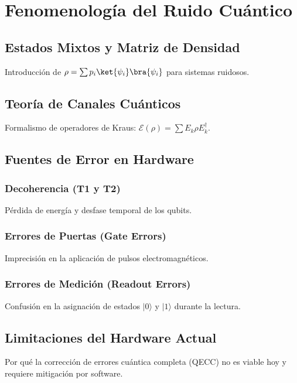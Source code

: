 \chapter{Fenomenología del Ruido Cuántico}
\label{cap:ruido}

\section{Estados Mixtos y Matriz de Densidad}
Introducción de $\rho = \sum p_i \ket{\psi_i}\bra{\psi_i}$ para sistemas ruidosos.

\section{Teoría de Canales Cuánticos}
Formalismo de operadores de Kraus: $\mathcal{E}(\rho) = \sum E_k \rho E_k^\dagger$.

\section{Fuentes de Error en Hardware}
\subsection{Decoherencia (T1 y T2)}
Pérdida de energía y desfase temporal de los qubits.
\subsection{Errores de Puertas (Gate Errors)}
Imprecisión en la aplicación de pulsos electromagnéticos.
\subsection{Errores de Medición (Readout Errors)}
Confusión en la asignación de estados $|0\rangle$ y $|1\rangle$ durante la lectura.

\section{Limitaciones del Hardware Actual}
Por qué la corrección de errores cuántica completa (QECC) no es viable hoy y requiere mitigación por software.